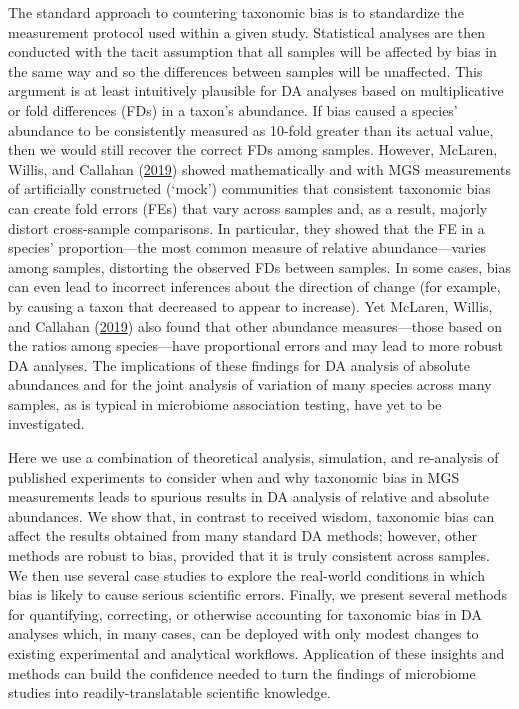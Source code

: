 \documentclass[
]{article}
\begin{document}
The standard approach to countering taxonomic bias is to standardize the measurement protocol used within a given study.
Statistical analyses are then conducted with the tacit assumption that all samples will be affected by bias in the same way and so the differences between samples will be unaffected.
This argument is at least intuitively plausible for DA analyses based on multiplicative or fold differences (FDs) in a taxon's abundance.
If bias caused a species' abundance to be consistently measured as 10-fold greater than its actual value, then we would still recover the correct FDs among samples.
However, McLaren, Willis, and Callahan (\protect\hyperlink{ref-mclaren2019cons}{2019}) showed mathematically and with MGS measurements of artificially constructed (`mock') communities that consistent taxonomic bias can create fold errors (FEs) that vary across samples and, as a result, majorly distort cross-sample comparisons.
In particular, they showed that the FE in a species' proportion---the most common measure of relative abundance---varies among samples, distorting the observed FDs between samples.
In some cases, bias can even lead to incorrect inferences about the direction of change (for example, by causing a taxon that decreased to appear to increase).
Yet McLaren, Willis, and Callahan (\protect\hyperlink{ref-mclaren2019cons}{2019}) also found that other abundance measures---those based on the ratios among species---have proportional errors and may lead to more robust DA analyses.
The implications of these findings for DA analysis of absolute abundances and for the joint analysis of variation of many species across many samples, as is typical in microbiome association testing, have yet to be investigated.

Here we use a combination of theoretical analysis, simulation, and re-analysis of published experiments to consider when and why taxonomic bias in MGS measurements leads to spurious results in DA analysis of relative and absolute abundances.
We show that, in contrast to received wisdom, taxonomic bias can affect the results obtained from many standard DA methods; however, other methods are robust to bias, provided that it is truly consistent across samples.
We then use several case studies to explore the real-world conditions in which bias is likely to cause serious scientific errors.
Finally, we present several methods for quantifying, correcting, or otherwise accounting for taxonomic bias in DA analyses which, in many cases, can be deployed with only modest changes to existing experimental and analytical workflows.
Application of these insights and methods can build the confidence needed to turn the findings of microbiome studies into readily-translatable scientific knowledge.
\end{document}
